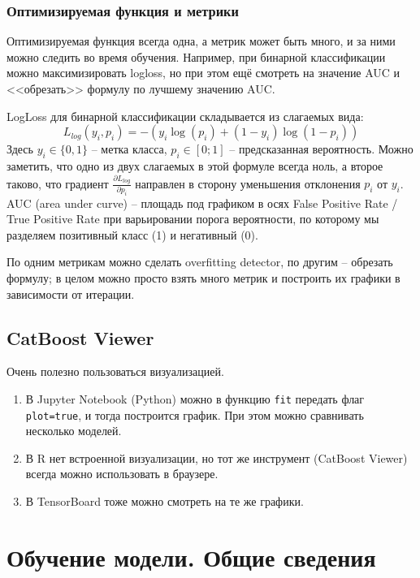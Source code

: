 \documentclass[a4paper,12pt]{article}
\begin{document}
\subsubsection{Оптимизируемая функция и метрики}

Оптимизируемая функция всегда одна, а метрик может быть много, и за ними можно следить во время обучения.
Например, при бинарной классификации можно максимизировать logloss, но при этом ещё смотреть на значение AUC и <<обрезать>> формулу по лучшему значению AUC.
\begin{leftbar}
	LogLoss для бинарной классификации складывается из слагаемых вида:
	$$ L_{log}(y_i, p_i) = -(y_i \log(p_i) + (1-y_i) \log(1-p_i)) $$
	Здесь $ y_i \in \{0, 1\} $ -- метка класса, $p_i \in [0;1]$ -- предсказанная вероятность.
	Можно заметить, что одно из двух слагаемых в этой формуле всегда ноль, а второе таково, что градиент $\frac{\partial L_{log}}{\partial p_i}$ направлен в сторону уменьшения отклонения $p_i$ от $y_i$.  \\
	
	AUC (area under curve) -- площадь под графиком в осях False Positive Rate / True Positive Rate при варьировании порога вероятности, по которому мы разделяем позитивный класс (1) и негативный (0).
\end{leftbar}
По одним метрикам можно сделать overfitting detector, по другим -- обрезать формулу; в целом можно просто взять много метрик и построить их графики в зависимости от итерации.

\subsection{CatBoost Viewer}

Очень полезно пользоваться визуализацией.
\begin{enumerate}[noitemsep]
    \item В Jupyter Notebook (Python) можно в функцию \texttt{fit} передать флаг \texttt{plot=true}, и тогда построится график.
    При этом можно сравнивать несколько моделей.
    \item В R нет встроенной визуализации, но тот же инструмент (CatBoost Viewer) всегда можно использовать в браузере.
    \item В TensorBoard тоже можно смотреть на те же графики.
\end{enumerate}

\section{Обучение модели. Общие сведения}
\end{document}

